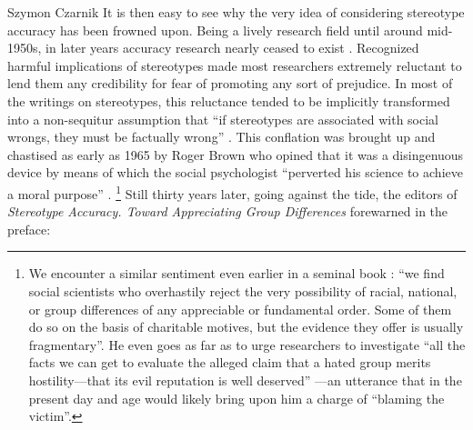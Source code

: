 \begin{artengenv}{Szymon Czarnik}
It is then easy to see why the very idea of considering stereotype accuracy has been frowned upon. Being a lively research field until around mid-1950s, in later years accuracy research nearly ceased to exist
\parencite[][]{jussim_social_2012}. %
 Recognized harmful implications of stereotypes made most researchers extremely reluctant to lend them any credibility for fear of promoting any sort of prejudice. In most of the writings on stereotypes, this reluctance tended to be implicitly transformed into a non-sequitur assumption that ``if stereotypes are associated with social wrongs, they must be factually wrong'' 
\parencite[][p.199]{jussim_unbearable_2009}. %
 This conflation was brought up and chastised as early as 1965 by Roger Brown who opined that it was a disingenuous device by means of which the social psychologist ``perverted his science to achieve a moral purpose'' 
\parencite[][p.5]{stroebe_stereotype_1989}.%
\footnote{We encounter a similar sentiment even earlier in a seminal book 
\parencite[][p.87]{allport_nature_1954}: %
 ``we find social scientists who overhastily reject the very possibility of racial, national, or group differences of any appreciable or fundamental order. Some of them do so on the basis of charitable motives, but the evidence they offer is usually fragmentary''. He even goes as far as to urge researchers to investigate ``all the facts we can get to evaluate the alleged claim that a hated group merits hostility—that its evil reputation is well deserved'' 
\parencite[][p.104]{allport_nature_1954}%
—an utterance that in the present day and age would likely bring upon him a charge of ``blaming the victim''. } Still thirty years later, going against the tide, the editors of \textit{Stereotype Accuracy. Toward Appreciating Group Differences} forewarned in the preface:




\end{artengenv}
